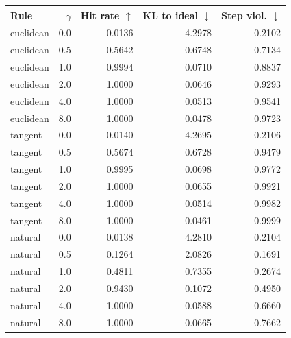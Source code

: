 \begin{tabular}{lrrrr}
\toprule
Rule & $\gamma$ & Hit rate $\uparrow$ & KL to ideal $\downarrow$ & Step viol. $\downarrow$ \\
\midrule
euclidean & 0.0 & 0.0136 & 4.2978 & 0.2102 \\
euclidean & 0.5 & 0.5642 & 0.6748 & 0.7134 \\
euclidean & 1.0 & 0.9994 & 0.0710 & 0.8837 \\
euclidean & 2.0 & 1.0000 & 0.0646 & 0.9293 \\
euclidean & 4.0 & 1.0000 & 0.0513 & 0.9541 \\
euclidean & 8.0 & 1.0000 & 0.0478 & 0.9723 \\
\midrule
tangent & 0.0 & 0.0140 & 4.2695 & 0.2106 \\
tangent & 0.5 & 0.5674 & 0.6728 & 0.9479 \\
tangent & 1.0 & 0.9995 & 0.0698 & 0.9772 \\
tangent & 2.0 & 1.0000 & 0.0655 & 0.9921 \\
tangent & 4.0 & 1.0000 & 0.0514 & 0.9982 \\
tangent & 8.0 & 1.0000 & 0.0461 & 0.9999 \\
\midrule
natural & 0.0 & 0.0138 & 4.2810 & 0.2104 \\
natural & 0.5 & 0.1264 & 2.0826 & 0.1691 \\
natural & 1.0 & 0.4811 & 0.7355 & 0.2674 \\
natural & 2.0 & 0.9430 & 0.1072 & 0.4950 \\
natural & 4.0 & 1.0000 & 0.0588 & 0.6660 \\
natural & 8.0 & 1.0000 & 0.0665 & 0.7662 \\
\bottomrule
\end{tabular}